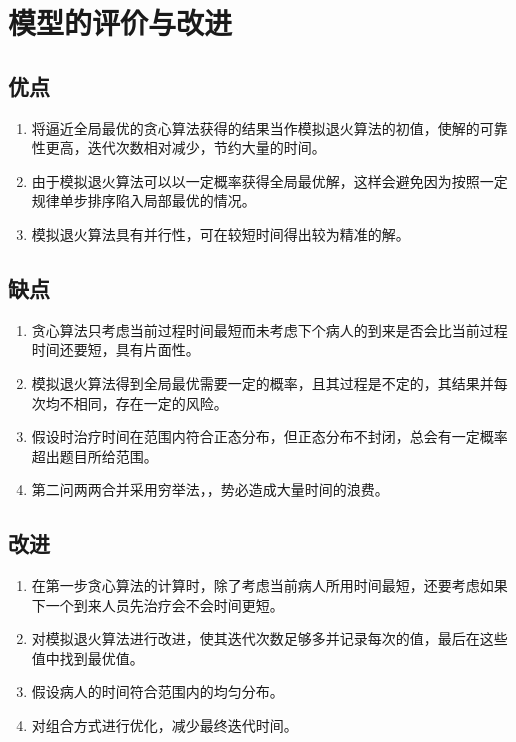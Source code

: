 \documentclass{article}
\begin{document}
\fi
\clearpage
\section{模型的评价与改进}
\subsection{优点}
\begin{enumerate}
	\item 将逼近全局最优的贪心算法获得的结果当作模拟退火算法的初值，使解的可靠性更高，迭代次数相对减少，节约大量的时间。
	\item 由于模拟退火算法可以以一定概率获得全局最优解，这样会避免因为按照一定规律单步排序陷入局部最优的情况。
	\item 模拟退火算法具有并行性，可在较短时间得出较为精准的解。	
\end{enumerate}
\subsection{缺点}
\begin{enumerate}
	\item 贪心算法只考虑当前过程时间最短而未考虑下个病人的到来是否会比当前过程时间还要短，具有片面性。
	\item 模拟退火算法得到全局最优需要一定的概率，且其过程是不定的，其结果并每次均不相同，存在一定的风险。
	\item 假设时治疗时间在范围内符合正态分布，但正态分布不封闭，总会有一定概率超出题目所给范围。
	\item 第二问两两合并采用穷举法，，势必造成大量时间的浪费。
\end{enumerate}
\subsection{改进}
\begin{enumerate}
	\item 在第一步贪心算法的计算时，除了考虑当前病人所用时间最短，还要考虑如果下一个到来人员先治疗会不会时间更短。
	\item 对模拟退火算法进行改进，使其迭代次数足够多并记录每次的值，最后在这些值中找到最优值。
	\item 假设病人的时间符合范围内的均匀分布。
	\item 对组合方式进行优化，减少最终迭代时间。
\end{enumerate}
\end{document}
